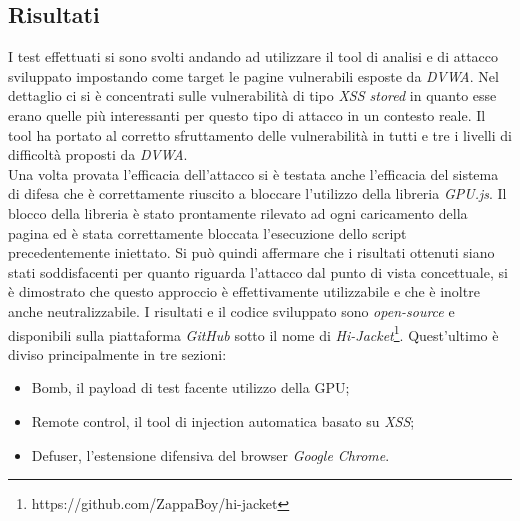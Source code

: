 \documentclass[conference, italian]{IEEEtran}
\begin{document}
\subsection{Risultati}\label{sec:results}
I test effettuati si sono svolti andando ad utilizzare il tool di analisi e di attacco sviluppato impostando come target le pagine vulnerabili esposte da \emph{DVWA}. Nel dettaglio ci si è concentrati sulle vulnerabilità di tipo \emph{XSS stored} in quanto esse erano quelle più interessanti per questo tipo di attacco in un contesto reale. Il tool ha portato al corretto sfruttamento delle vulnerabilità in tutti e tre i livelli di difficoltà proposti da \emph{DVWA}.\\
Una volta provata l'efficacia dell'attacco si è testata anche l'efficacia del sistema di difesa che è correttamente riuscito a bloccare l'utilizzo della libreria \emph{GPU.js}. Il blocco della libreria è stato prontamente rilevato ad ogni caricamento della pagina ed è stata correttamente bloccata l'esecuzione dello script precedentemente iniettato.
Si può quindi affermare che i risultati ottenuti siano stati soddisfacenti per quanto riguarda l'attacco dal punto di vista concettuale, si è dimostrato che questo approccio è effettivamente utilizzabile e che è inoltre anche neutralizzabile. I risultati e il codice sviluppato sono \emph{open-source} e disponibili sulla piattaforma \emph{GitHub} sotto il nome di \emph{Hi-Jacket}\footnote{https://github.com/ZappaBoy/hi-jacket}. Quest'ultimo è diviso principalmente in tre sezioni:
\begin{itemize}
  \item Bomb, il payload di test facente utilizzo della GPU;\@
  \item Remote control, il tool di injection automatica basato su \emph{XSS};
  \item Defuser, l'estensione difensiva del browser \emph{Google Chrome}.
\end{itemize}
\end{document}
